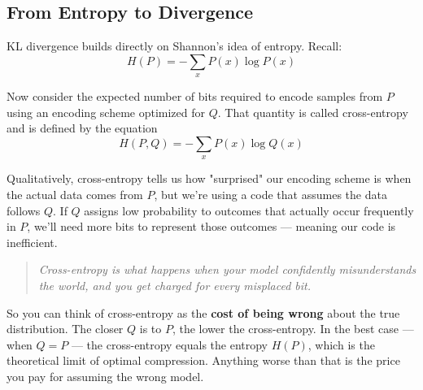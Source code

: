\subsection{From Entropy to Divergence}

KL divergence builds directly on Shannon’s idea of entropy. Recall:
\[
H(P) = -\sum_x P(x) \log P(x)
\]

Now consider the expected number of bits required to encode samples from \( P \) using an encoding scheme optimized for \( Q \). That quantity is called cross-entropy and is defined by the equation
\[
H(P, Q) = -\sum_x P(x) \log Q(x)
\]

Qualitatively, cross-entropy tells us how "surprised" our encoding scheme is when the actual data comes from \( P \), but we’re using a code that assumes the data follows \( Q \). If \( Q \) assigns low probability to outcomes that actually occur frequently in \( P \), we’ll need more bits to represent those outcomes — meaning our code is inefficient.


\begin{quote}
\emph{Cross-entropy is what happens when your model confidently misunderstands the world, and you get charged for every misplaced bit.}
\end{quote}


So you can think of cross-entropy as the \textbf{cost of being wrong} about the true distribution. The closer \( Q \) is to \( P \), the lower the cross-entropy. In the best case — when \( Q = P \) — the cross-entropy equals the entropy \( H(P) \), which is the theoretical limit of optimal compression. Anything worse than that is the price you pay for assuming the wrong model.

\vspace{1em}

